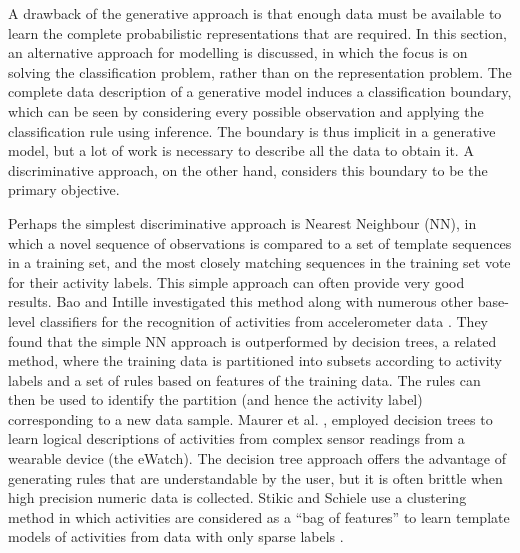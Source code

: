 A drawback of the generative approach is that enough data must be available to learn the complete probabilistic representations that are required. In this section, an alternative approach for modelling is discussed, in which the focus is on solving the classification problem, rather than on the representation problem. The complete data description of a generative model induces a classification boundary, which can be seen by considering every possible observation and applying the classification rule using inference. The boundary is thus implicit in a generative model, but a lot of work is necessary to describe all the data to obtain it. A discriminative approach, on the other hand, considers this boundary to be the primary objective.

Perhaps the simplest discriminative approach is Nearest Neighbour (NN), in which a novel sequence of observations is compared to a set of template sequences in a training set, and the most closely matching sequences in the training set vote for their activity labels. This simple approach can often provide very good results. Bao and Intille investigated this method along with numerous other base-level classifiers for the recognition of activities from accelerometer data \cite{Bao2004}. They found that the simple NN approach is outperformed by decision trees, a related method, where the training data is partitioned into subsets according to activity labels and a set of rules based on features of the training data. The rules can then be used to identify the partition (and hence the activity label) corresponding to a new data sample. Maurer et al. \cite{Maurer2006a}, employed decision trees to learn logical descriptions of activities from complex sensor readings from a wearable device (the eWatch). The decision tree approach offers the advantage of generating rules that are understandable by the user, but it is often brittle when high precision numeric data is collected. Stikic and Schiele use a clustering method in which activities are considered as a “bag of features” to learn template models of activities from data with only sparse labels \cite{Stikic2009}. 

